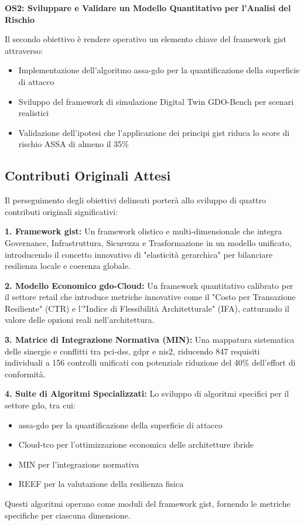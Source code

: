 \textbf{OS2: Sviluppare e Validare un Modello Quantitativo per l'Analisi del Rischio}

Il secondo obiettivo è rendere operativo un elemento chiave del framework \gls{gist} attraverso:
\begin{itemize}
\item Implementazione dell'algoritmo \gls{assa-gdo} per la quantificazione della superficie di attacco
\item Sviluppo del framework di simulazione Digital Twin GDO-Bench per scenari realistici
\item Validazione dell'ipotesi che l'applicazione dei principi \gls{gist} riduca lo score di rischio ASSA di almeno il 35\%
\end{itemize}

\subsection{\texorpdfstring{\textbf{Contributi Originali Attesi}}{1.3.3 - Contributi Originali Attesi}}
\label{subsec:contributi_originali}

Il perseguimento degli obiettivi delineati porterà allo sviluppo di quattro contributi originali significativi:

\textbf{1. Framework \gls{gist}:} Un framework olistico e multi-dimensionale che integra Governance, Infrastruttura, Sicurezza e Trasformazione in un modello unificato, introducendo il concetto innovativo di "elasticità gerarchica" per bilanciare resilienza locale e coerenza globale.

\textbf{2. Modello Economico \gls{gdo}-Cloud:} Un framework quantitativo calibrato per il settore retail che introduce metriche innovative come il "Costo per Transazione Resiliente" (CTR) e l'"Indice di Flessibilità Architetturale" (IFA), catturando il valore delle opzioni reali nell'architettura.

\textbf{3. Matrice di Integrazione Normativa (MIN):} Una mappatura sistematica delle sinergie e conflitti tra \gls{pci-dss}, \gls{gdpr} e \gls{nis2}, riducendo 847 requisiti individuali a 156 controlli unificati con potenziale riduzione del 40\% dell'effort di conformità.

\textbf{4. Suite di Algoritmi Specializzati:} Lo sviluppo di algoritmi specifici per il settore \gls{gdo}, tra cui:
\begin{itemize}
\item \gls{assa-gdo} per la quantificazione della superficie di attacco
\item Cloud-\gls{tco} per l'ottimizzazione economica delle architetture ibride
\item MIN per l'integrazione normativa
\item REEF per la valutazione della resilienza fisica
\end{itemize}
Questi algoritmi operano come moduli del framework \gls{gist}, fornendo le metriche specifiche per ciascuna dimensione.

